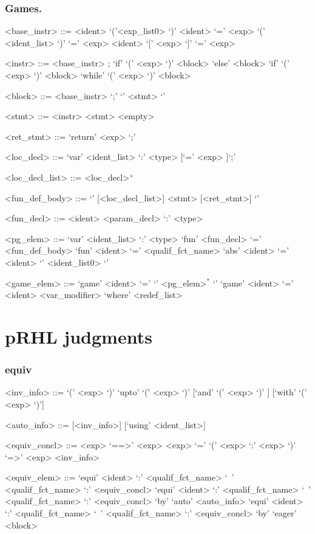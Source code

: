\subsubsection*{Games.}
\begin{ecgrammar}

<base_instr> ::= <ident> `('<exp_list0> `)'
 \alt <ident> `=' <exp> 
 \alt `(' <ident_list> `)' `=' <exp> 
 \alt <ident> `[' <exp> `]' `=' <exp> 

<instr> ::= <base_instr> ;
 \alt `if' `(' <exp> `)' <block> `else' <block> 
 \alt `if' `(' <exp> `)' <block>
 \alt `while' `(' <exp> `)' <block> 

<block> ::= <base_instr> `;' 
 \alt `{' <stmt> `}' 

<stmt> ::= <instr> <stmt>
 \alt <empty>


<ret_stmt> ::= `return' <exp> `;'

<loc_decl> ::= `var' <ident_list> `:' <type> [`=' <exp> ]`;'

<loc_decl_list> ::= <loc_decl>$^+$ 

<fun_def_body> ::= `{' [<loc_decl_list>] <stmt> [<ret_stmt>] `}' 

<fun_decl> ::= <ident> <param_decl> `:' <type> 

<pg_elem> ::= 
      `var' <ident_list> `:' <type> 
 \alt `fun' <fun_decl> `=' <fun_def_body>
 \alt `fun' <ident> `=' <qualif_fct_name> 
 \alt `abs' <ident> `=' <ident> `{' <ident_list0> `}' 

<game_elem> ::= `game' <ident> `=' `{' <pg_elem>$^*$ `}'
 \alt `game' <ident> `=' <ident> <var_modifier> `where' <redef_list>

\end{ecgrammar}




\section{pRHL judgments}
\subsubsection*{equiv}
\begin{ecgrammar}

<inv_info> ::=
  `(' <exp> `)'          
 \alt `upto' `(' <exp> `)' [`and' `(' <exp> `)' ] [`with' `(' <exp> `)'] 


<auto_info> ::=
  [<inv_info>] [`using' <ident_list>]

 

<equiv_concl> ::=
      <exp> `==>' <exp>
 \alt <exp> `=' `(' <exp> `:' <exp> `)' `=>' <exp>
 \alt <inv_info> 

<equiv_elem> ::= 
      `equi' <ident> `:' <qualif_fct_name> `~' <qualif_fct_name> `:' <equiv_concl>
 \alt `equi' <ident> `:' <qualif_fct_name> `~' <qualif_fct_name> `:' <equiv_concl> `by' `auto' <auto_info> 
 \alt `equi' <ident> `:' <qualif_fct_name> `~' <qualif_fct_name> `:' <equiv_concl> `by' `eager' <block>

\end{ecgrammar}



